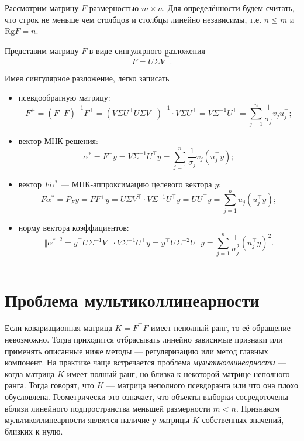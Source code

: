 \documentclass[11pt,a4paper]{article}
\begin{document}
Рассмотрим матрицу \(F\) размерностью \(m \times n\). Для определённости
будем считать, что строк не меньше чем столбцов и столбцы линейно
независимы, т.е. \(n \le m\) и \(\mathrm{Rg}F = n\).

Представим матрицу \(F\) в виде сингулярного разложения
\[ F = U \Sigma V^\top. \]

Имея сингулярное разложение, легко записать

\begin{itemize}
\item
  псевдообратную матрицу:
  \[ F^{+} = (F^\top F)^{-1}F^\top = (V \Sigma U^\top U \Sigma V^\top)^{-1} \cdot V \Sigma U^\top = V \Sigma^{-1}U^\top = \sum_{j=1}^n \frac{1}{{\sigma_j} }v_j u_j^\top;  \label{eq:psevdo}\tag{1} \]
\item
  вектор МНК-решения:
  \[ \alpha^* = F^{+} y  = V \Sigma^{-1}U^\top y = \sum_{j=1}^n \frac{1}{{\sigma_j}}v_j (u_j^\top y);  \label{eq:alpha-res}\tag{2} \]
\item
  вектор \(F\alpha^*\) --- МНК-аппроксимацию целевого вектора \(y\):
  \[ F\alpha^* = P_F y = FF^{+}y = U \Sigma V^\top \cdot V \Sigma^{-1}U^\top y = UU^\top y = \sum_{j=1}^n u_j (u_j^\top y);  \label{eq:F-alpha-res}\tag{3} \]
\item
  норму вектора коэффициентов:
  \[ \Vert \alpha^* \Vert^2 = y^\top U \Sigma^{-1}V^\top \cdot V \Sigma^{-1}U^\top y = y^\top U \Sigma^{-2}U^\top y = \sum_{j=1}^n \frac{1}{\sigma_j^2} (u_j^\top y)^2.  \label{eq:alpha-res-norm}\tag{4} \]
\end{itemize}

    \begin{center}\rule{0.5\linewidth}{0.5pt}\end{center}

    \hypertarget{ux43fux440ux43eux431ux43bux435ux43cux430-ux43cux443ux43bux44cux442ux438ux43aux43eux43bux43bux438ux43dux435ux430ux440ux43dux43eux441ux442ux438}{%
\section{Проблема
мультиколлинеарности}\label{ux43fux440ux43eux431ux43bux435ux43cux430-ux43cux443ux43bux44cux442ux438ux43aux43eux43bux43bux438ux43dux435ux430ux440ux43dux43eux441ux442ux438}}

Если ковариационная матрица \(K = F^\top F\) имеет неполный ранг, то её
обращение невозможно. Тогда приходится отбрасывать линейно зависимые
признаки или применять описанные ниже методы --- регуляризацию или метод
главных компонент. На практике чаще встречается проблема
\emph{мультиколлинеарности} --- когда матрица \(K\) имеет полный ранг,
но близка к некоторой матрице неполного ранга. Тогда говорят, что \(K\)
--- матрица неполного псевдоранга или что она плохо обусловлена.
Геометрически это означает, что объекты выборки сосредоточены вблизи
линейного подпространства меньшей размерности \(m < n\). Признаком
мультиколлинеарности является наличие у матрицы \(K\) собственных
значений, близких к нулю.
\end{document}
